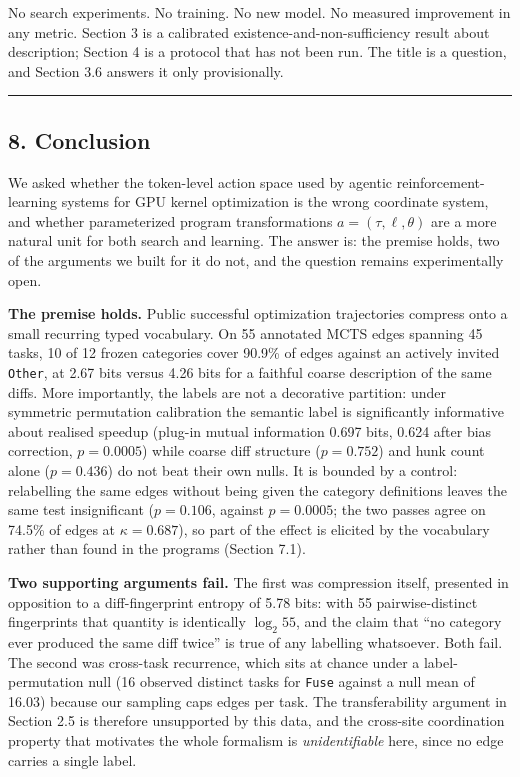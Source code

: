\documentclass[
  11pt,
]{article}
\begin{document}
No search experiments. No training. No new model. No measured improvement in any metric. Section 3 is a calibrated existence-and-non-sufficiency result about description; Section 4 is a protocol that has not been run. The title is a question, and Section 3.6 answers it only provisionally.

\begin{center}\rule{0.5\linewidth}{0.5pt}\end{center}

\hypertarget{conclusion}{%
\subsection{8. Conclusion}\label{conclusion}}

We asked whether the token-level action space used by agentic reinforcement-learning systems for GPU kernel optimization is the wrong coordinate system, and whether parameterized program transformations \(a = (\tau, \ell, \theta)\) are a more natural unit for both search and learning. The answer is: the premise holds, two of the arguments we built for it do not, and the question remains experimentally open.

\textbf{The premise holds.} Public successful optimization trajectories compress onto a small recurring typed vocabulary. On 55 annotated MCTS edges spanning 45 tasks, 10 of 12 frozen categories cover 90.9\% of edges against an actively invited \texttt{Other}, at 2.67 bits versus 4.26 bits for a faithful coarse description of the same diffs. More importantly, the labels are not a decorative partition: under symmetric permutation calibration the semantic label is significantly informative about realised speedup (plug-in mutual information 0.697 bits, 0.624 after bias correction, \(p = 0.0005\)) while coarse diff structure (\(p = 0.752\)) and hunk count alone (\(p = 0.436\)) do not beat their own nulls. It is bounded by a control: relabelling the same edges without being given the category definitions leaves the same test insignificant (\(p = 0.106\), against \(p = 0.0005\); the two passes agree on 74.5\% of edges at \(\kappa = 0.687\)), so part of the effect is elicited by the vocabulary rather than found in the programs (Section 7.1).

\textbf{Two supporting arguments fail.} The first was compression itself, presented in opposition to a diff-fingerprint entropy of 5.78 bits: with 55 pairwise-distinct fingerprints that quantity is identically \(\log_2 55\), and the claim that ``no category ever produced the same diff twice'' is true of any labelling whatsoever. Both fail. The second was cross-task recurrence, which sits at chance under a label-permutation null (16 observed distinct tasks for \texttt{Fuse} against a null mean of 16.03) because our sampling caps edges per task. The transferability argument in Section 2.5 is therefore unsupported by this data, and the cross-site coordination property that motivates the whole formalism is \emph{unidentifiable} here, since no edge carries a single label.
\end{document}
